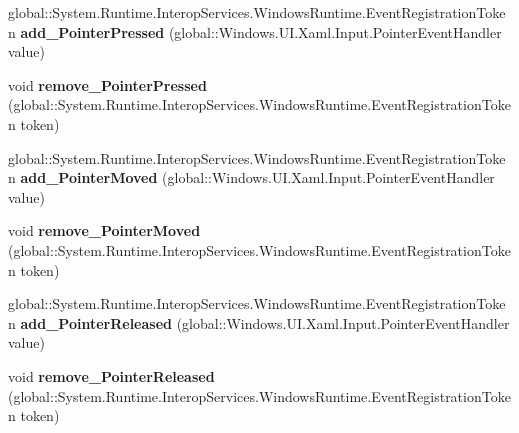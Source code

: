 \begin{DoxyCompactItemize}
\item 
\mbox{\label{interface_windows_1_1_u_i_1_1_xaml_1_1_i_u_i_element_ac6c56c4e4d441548d94d567610440f7a}} 
global\+::\+System.\+Runtime.\+Interop\+Services.\+Windows\+Runtime.\+Event\+Registration\+Token {\bfseries add\+\_\+\+Pointer\+Pressed} (global\+::\+Windows.\+U\+I.\+Xaml.\+Input.\+Pointer\+Event\+Handler value)
\item 
\mbox{\label{interface_windows_1_1_u_i_1_1_xaml_1_1_i_u_i_element_a11ea5ff510170be96baba63e50ef0d68}} 
void {\bfseries remove\+\_\+\+Pointer\+Pressed} (global\+::\+System.\+Runtime.\+Interop\+Services.\+Windows\+Runtime.\+Event\+Registration\+Token token)
\item 
\mbox{\label{interface_windows_1_1_u_i_1_1_xaml_1_1_i_u_i_element_a186c081f1e37b9989fc4ddd5820d840c}} 
global\+::\+System.\+Runtime.\+Interop\+Services.\+Windows\+Runtime.\+Event\+Registration\+Token {\bfseries add\+\_\+\+Pointer\+Moved} (global\+::\+Windows.\+U\+I.\+Xaml.\+Input.\+Pointer\+Event\+Handler value)
\item 
\mbox{\label{interface_windows_1_1_u_i_1_1_xaml_1_1_i_u_i_element_ad8d5295f79014845522686f6bf012501}} 
void {\bfseries remove\+\_\+\+Pointer\+Moved} (global\+::\+System.\+Runtime.\+Interop\+Services.\+Windows\+Runtime.\+Event\+Registration\+Token token)
\item 
\mbox{\label{interface_windows_1_1_u_i_1_1_xaml_1_1_i_u_i_element_ab3b709a6be4af0f8547f52d2157bd763}} 
global\+::\+System.\+Runtime.\+Interop\+Services.\+Windows\+Runtime.\+Event\+Registration\+Token {\bfseries add\+\_\+\+Pointer\+Released} (global\+::\+Windows.\+U\+I.\+Xaml.\+Input.\+Pointer\+Event\+Handler value)
\item 
\mbox{\label{interface_windows_1_1_u_i_1_1_xaml_1_1_i_u_i_element_abd23ebff773fb5a9158d2ee59097988e}} 
void {\bfseries remove\+\_\+\+Pointer\+Released} (global\+::\+System.\+Runtime.\+Interop\+Services.\+Windows\+Runtime.\+Event\+Registration\+Token token)
\item 

\end{DoxyCompactItemize}
